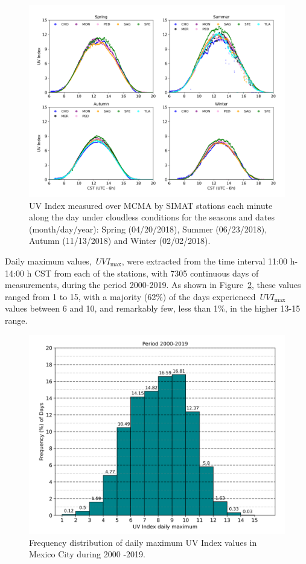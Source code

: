 \documentclass[10pt]{article}
\begin{document}
\begin{figure}[H]
\begin{center}
\includegraphics[width=0.70\columnwidth]{figures/season/season}
\caption{{UV Index measured over MCMA by SIMAT stations each minute along the day
under cloudless conditions for the seasons and dates (month/day/year):
Spring (04/20/2018), Summer (06/23/2018), Autumn (11/13/2018) and Winter
(02/02/2018).
{\label{628947}}%
}}
\end{center}
\end{figure}

Daily maximum values,~\(UVI_{\max}\), were extracted from the time
interval 11:00 h-14:00 h CST from each of the stations, with 7305
continuous days of measurements, during the period 2000-2019. As shown
in Figure~{\ref{461017}}, these values ranged from 1 to
15, with a majority (62\%) of the days experienced~\(UVI_{\max}\)
values between 6 and 10, and remarkably few, less than 1\%, in the
higher 13-15 range.
\begin{figure}[H]
\begin{center}
\includegraphics[width=0.49\columnwidth]{figures/HistTotal/HistTotal}
\caption{{Frequency distribution of daily maximum UV Index values in Mexico City
during 2000 -2019.
{\label{461017}}%
}}
\end{center}
\end{figure}
\end{document}
